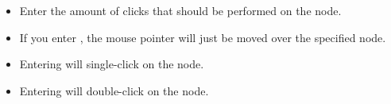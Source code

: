 % 
\begin{itemize}
\item Enter the amount of clicks that should be performed on the node.
\item If you enter , the mouse pointer will just be moved over the specified node.
\item Entering  will single-click on the node.
\item Entering  will double-click on the node. 
\end{itemize}
